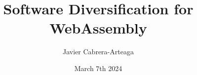 
\title{ Software Diversification for WebAssembly }
\author{Javier Cabrera-Arteaga }
\date{March 7th 2024}


\address{KTH Royal Institute of Technology \\School of Electrical Engineering and Computer Science\\ Division of Software and Computer Systems \\ SE-10044 Stockholm\\ Sweden}
